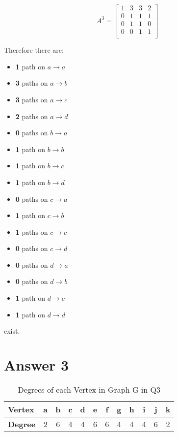 \documentclass[11pt]{article}
\begin{document}
\begin{figure}[H]
$$ A^3=  \begin{bmatrix}
        1 & 3 & 3 & 2 \\
        0 & 1 & 1 & 1 \\
        0 & 1 & 1 & 0 \\
        0 & 0 & 1 & 1 \\
    \end{bmatrix} $$
\end{figure}
Therefore there are;
\begin{itemize}
    \item \textbf{1} path on $a \rightarrow a$
    \item \textbf{3} paths on $a \rightarrow b$
    \item \textbf{3} paths on $a \rightarrow c$
    \item \textbf{2} paths on $a \rightarrow d$
    \item \textbf{0} paths on $b \rightarrow a$
    \item \textbf{1} path on $b \rightarrow b$
    \item \textbf{1} path on $b \rightarrow c$
    \item \textbf{1} path on $b \rightarrow d$
    \item \textbf{0} paths on $c \rightarrow a$
    \item \textbf{1} path on $c \rightarrow b$
    \item \textbf{1} paths on $c \rightarrow c$
    \item \textbf{0} paths on $c \rightarrow d$
    \item \textbf{0} paths on $d \rightarrow a$
    \item \textbf{0} paths on $d \rightarrow b$
    \item \textbf{1} path on $d \rightarrow c$
    \item \textbf{1} path on $d \rightarrow d$
\end{itemize}
exist.

\section*{Answer 3}
\begin{table}[H]
    \centering
    \renewcommand{\arraystretch}{1.25}
    \begin{tabular}{|l||c|c|c|c|c|c|c|c|c|c|c|}	
    \hline 							
    \textbf{Vertex} & a & b & c & d & e & f & g & h & i & j & k  \\ \hline
    \textbf{Degree} & 2 & 6 & 4 & 4 & 6 & 6 & 4 & 4 & 4 & 6 & 2 \\ \hline
    \end{tabular}
    \caption{ Degrees of each Vertex in Graph G in Q3 }
    \label{tq3}
    \end{table}
\end{document}
